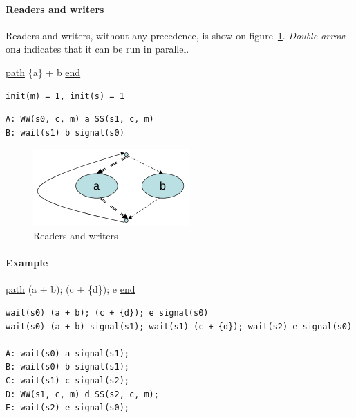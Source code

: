 \paragraph{Readers and writers}
Readers and writers, without any precedence, is show on figure~\ref{img:rw}. \emph{Double arrow} on\texttt{a} indicates that it can be run in parallel.

\underline{path} \{a\} + b \underline{end}

\begin{verbatim}
init(m) = 1, init(s) = 1
\end{verbatim}

\begin{Parallel}{}{}
\end{Parallel}

\begin{verbatim}
A: WW(s0, c, m) a SS(s1, c, m)
B: wait(s1) b signal(s0)
\end{verbatim}

\begin{figure}[hbtp]
\centering
\includegraphics[scale=0.6]{images/synchronization/pathexp_rw.png}
\caption{Readers and writers}
\label{img:rw}
\end{figure}

\paragraph{Example}
\underline{path} (a + b); (c + \{d\}); e \underline{end}

{\small
\begin{verbatim}
wait(s0) (a + b); (c + {d}); e signal(s0)
wait(s0) (a + b) signal(s1); wait(s1) (c + {d}); wait(s2) e signal(s0)

A: wait(s0) a signal(s1);
B: wait(s0) b signal(s1);
C: wait(s1) c signal(s2);
D: WW(s1, c, m) d SS(s2, c, m);
E: wait(s2) e signal(s0);
\end{verbatim}
\small}